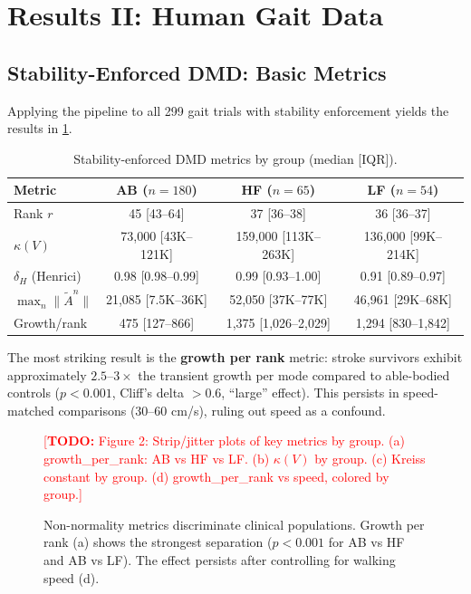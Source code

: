 \documentclass[12pt]{article}
\newcommand{\norm}[1]{\lVert #1 \rVert}
\newcommand{\Atilde}{\tilde{A}}
\newcommand{\todo}[1]{\textcolor{red}{[\textbf{TODO:} #1]}}
\begin{document}
\section{Results II: Human Gait Data}
\label{sec:results_gait}

\subsection{Stability-Enforced DMD: Basic Metrics}
\label{sec:results_basic}

Applying the pipeline to all 299 gait trials with stability enforcement
yields the results in \cref{tab:basic_metrics}.

\begin{table}[t]
\centering
\caption{Stability-enforced DMD metrics by group (median [IQR]).}
\label{tab:basic_metrics}
\begin{tabular}{lccc}
\toprule
\textbf{Metric} & \textbf{AB} ($n=180$) & \textbf{HF} ($n=65$) & \textbf{LF} ($n=54$) \\
\midrule
Rank $r$
  & 45 [43--64] & 37 [36--38] & 36 [36--37] \\
$\kappa(V)$
  & 73{,}000 [43K--121K] & 159{,}000 [113K--263K] & 136{,}000 [99K--214K] \\
$\delta_H$ (Henrici)
  & 0.98 [0.98--0.99] & 0.99 [0.93--1.00] & 0.91 [0.89--0.97] \\
$\max_n\norm{\Atilde^n}$
  & 21{,}085 [7.5K--36K] & 52{,}050 [37K--77K] & 46{,}961 [29K--68K] \\
Growth/rank
  & 475 [127--866] & 1{,}375 [1{,}026--2{,}029] & 1{,}294 [830--1{,}842] \\
\bottomrule
\end{tabular}
\end{table}

The most striking result is the \textbf{growth per rank} metric:
stroke survivors exhibit approximately $2.5$--$3\times$ the transient
growth per mode compared to able-bodied controls ($p < 0.001$, Cliff's
delta $> 0.6$, ``large'' effect). This persists in speed-matched
comparisons (30--60 cm/s), ruling out speed as a confound.

\begin{figure}[t]
  \centering
  \todo{Figure 2: Strip/jitter plots of key metrics by group.
  (a) growth\_per\_rank: AB vs HF vs LF.
  (b) $\kappa(V)$ by group.
  (c) Kreiss constant by group.
  (d) growth\_per\_rank vs speed, colored by group.}
  \caption{Non-normality metrics discriminate clinical populations.
  Growth per rank (a) shows the strongest separation ($p < 0.001$
  for AB vs HF and AB vs LF). The effect persists after controlling
  for walking speed (d).}
  \label{fig:gait_metrics}
\end{figure}
\end{document}
